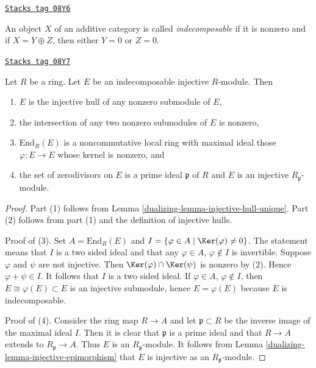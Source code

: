 \begin{definition}[Indecomposable]
\label{dualizing-definition-indecomposable}
\href{https://stacks.math.columbia.edu/tag/08Y6}{\texttt{Stacks tag 08Y6}}

An object $X$ of an additive category is called {\it indecomposable}
if it is nonzero and if $X = Y \oplus Z$, then either $Y = 0$ or $Z = 0$.
\end{definition}

\begin{lemma}
\label{dualizing-lemma-indecomposable-injective}
\href{https://stacks.math.columbia.edu/tag/08Y7}{\texttt{Stacks tag 08Y7}}

Let $R$ be a ring. Let $E$ be an indecomposable injective $R$-module.
Then
\begin{enumerate}
\item $E$ is the injective hull of any nonzero submodule of $E$,
\item the intersection of any two nonzero submodules of $E$ is nonzero,
\item $\text{End}_R(E)$ is a noncommutative local ring with maximal
ideal those $\varphi : E \to E$ whose kernel is nonzero, and
\item the set of zerodivisors on $E$ is a prime ideal $\mathfrak p$ of $R$
and $E$ is an injective $R_\mathfrak p$-module.
\end{enumerate}
\end{lemma}

\begin{proof}

Part (1) follows from Lemma \ref{dualizing-lemma-injective-hull-unique}.
Part (2) follows from part (1) and the definition of injective hulls.

\medskip\noindent
Proof of (3). Set $A = \text{End}_R(E)$ and
$I = \{\varphi \in A \mid \Ker(\varphi) \not = 0\}$.
The statement means that $I$ is a two sided ideal and
that any $\varphi \in A$, $\varphi \not \in I$ is invertible.
Suppose $\varphi$ and $\psi$ are not injective.
Then $\Ker(\varphi) \cap \Ker(\psi)$ is nonzero
by (2). Hence $\varphi + \psi \in I$. It follows that $I$
is a two sided ideal. If $\varphi \in A$, $\varphi \not \in I$,
then $E \cong \varphi(E) \subset E$ is an injective submodule,
hence $E = \varphi(E)$ because $E$ is indecomposable.

\medskip\noindent
Proof of (4). Consider the ring map $R \to A$ and let $\mathfrak p \subset R$
be the inverse image of the maximal ideal $I$. Then it is clear
that $\mathfrak p$ is a prime ideal and that $R \to A$ extends to
$R_\mathfrak p \to A$. Thus $E$ is an $R_\mathfrak p$-module.
It follows from Lemma \ref{dualizing-lemma-injective-epimorphism} that $E$ is injective
as an $R_\mathfrak p$-module.
\end{proof}

